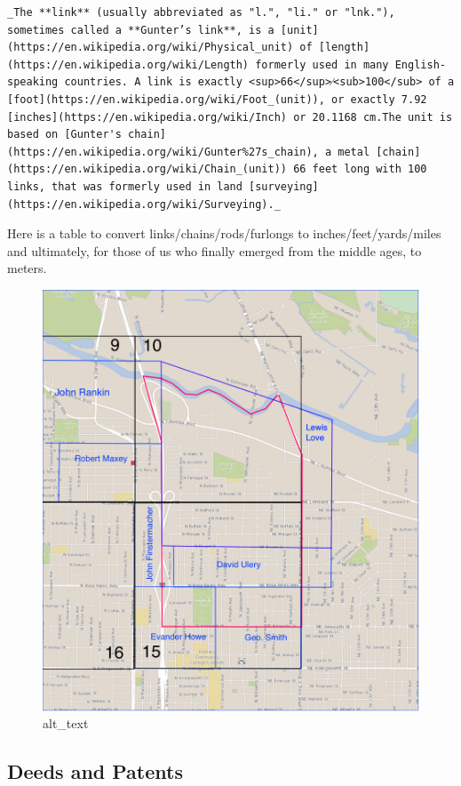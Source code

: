 \documentclass[
  12pt,
]{book}
\begin{document}
\begin{verbatim}
_The **link** (usually abbreviated as "l.", "li." or "lnk."), sometimes called a **Gunter’s link**, is a [unit](https://en.wikipedia.org/wiki/Physical_unit) of [length](https://en.wikipedia.org/wiki/Length) formerly used in many English-speaking countries. A link is exactly ​<sup>66</sup>⁄<sub>100</sub> of a [foot](https://en.wikipedia.org/wiki/Foot_(unit)), or exactly 7.92 [inches](https://en.wikipedia.org/wiki/Inch) or 20.1168 cm.The unit is based on [Gunter's chain](https://en.wikipedia.org/wiki/Gunter%27s_chain), a metal [chain](https://en.wikipedia.org/wiki/Chain_(unit)) 66 feet long with 100 links, that was formerly used in land [surveying](https://en.wikipedia.org/wiki/Surveying)._
\end{verbatim}

Here is a table to convert links/chains/rods/furlongs to inches/feet/yards/miles and ultimately, for those of us who finally emerged from the middle ages, to meters.

\begin{figure}
\centering
\includegraphics{images/02_images/image5.png}
\caption{alt\_text}
\end{figure}

\hypertarget{deeds-and-patents}{%
\subsection{Deeds and Patents}\label{deeds-and-patents}}
\end{document}
